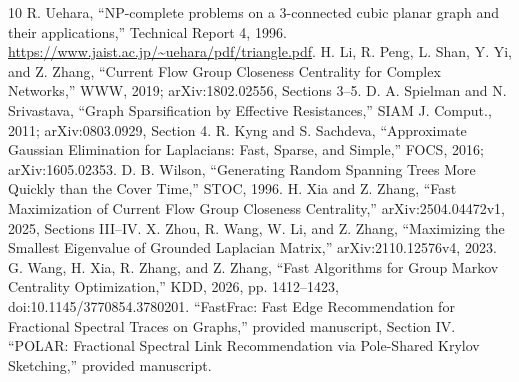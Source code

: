 \documentclass[11pt]{article}
\begin{document}
\begin{thebibliography}{10}
 R. Uehara,
``NP-complete problems on a 3-connected cubic planar graph and
 their applications,'' Technical Report 4, 1996.
\url{https://www.jaist.ac.jp/~uehara/pdf/triangle.pdf}.
 H. Li, R. Peng, L. Shan, Y. Yi, and Z. Zhang,
``Current Flow Group Closeness Centrality for Complex Networks,''
WWW, 2019; arXiv:1802.02556, Sections 3--5.
 D. A. Spielman and N. Srivastava,
``Graph Sparsification by Effective Resistances,'' SIAM J. Comput.,
2011; arXiv:0803.0929, Section 4.
 R. Kyng and S. Sachdeva,
``Approximate Gaussian Elimination for Laplacians: Fast, Sparse, and
Simple,'' FOCS, 2016; arXiv:1605.02353.
 D. B. Wilson,
``Generating Random Spanning Trees More Quickly than the Cover Time,''
STOC, 1996.
 H. Xia and Z. Zhang,
``Fast Maximization of Current Flow Group Closeness Centrality,''
arXiv:2504.04472v1, 2025, Sections III--IV.
 X. Zhou, R. Wang, W. Li, and Z. Zhang,
``Maximizing the Smallest Eigenvalue of Grounded Laplacian Matrix,''
arXiv:2110.12576v4, 2023.
 G. Wang, H. Xia, R. Zhang, and Z. Zhang,
``Fast Algorithms for Group Markov Centrality Optimization,''
KDD, 2026, pp. 1412--1423, doi:10.1145/3770854.3780201.
 ``FastFrac: Fast Edge Recommendation for Fractional
Spectral Traces on Graphs,'' provided manuscript, Section IV.
 ``POLAR: Fractional Spectral Link Recommendation via
Pole-Shared Krylov Sketching,'' provided manuscript.
\end{thebibliography}
\end{document}
